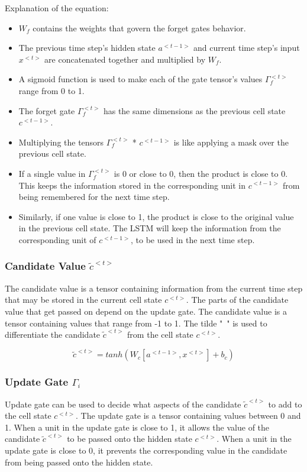 Explanation of the equation:
\begin{itemize}
    \item $W_f$ contains the weights that govern the forget gate\textquotesingle s behavior.
    \item The previous time step's hidden state $a^{<t - 1>}$  and current time step's input $x^{<t>}$ are concatenated together and multiplied by $W_f$.
    \item A sigmoid function is used to make each of the gate tensor's values $\Gamma _f ^ {<t>}$ range from 0 to 1.
    \item The forget gate $\Gamma _f ^ {<t>}$
          has the same dimensions as the previous cell state $c^{<t - 1>}$.
    \item Multiplying the tensors $\Gamma _f ^ {<t>}$ * $c^{<t - 1>}$
          is like applying a mask over the previous cell state.
    \item If a single value in $\Gamma _f ^ {<t>}$ is 0 or close to 0, then the product is close to 0. This keeps the information stored in the corresponding unit in $c^{<t - 1>}$ from being remembered for the next time step.
    \item Similarly, if one value is close to 1, the product is close to the original value in the previous cell state. The LSTM will keep the information from the corresponding unit of $c^{<t - 1>}$, to be used in the next time step.
\end{itemize}

\subsubsection{Candidate Value $\tilde{c}^{<t>}$}
The candidate value is a tensor containing information from the current time step that may be stored in the current cell state $c^{<t>}$. The parts of the candidate value that get passed on depend on the update gate.
The candidate value is a tensor containing values that range from -1 to 1.
The tilde "~" is used to differentiate the candidate $\tilde{c}^{<t>}$ from the cell state $c^{<t>}$.

\begin{equation}
    \tilde{c}^{<t>} = tanh(W_c[a^{<t - 1>}, x^{<t>}] + b_c)
\end{equation}

\subsubsection{Update Gate $\Gamma _i$}
Update gate can be used to decide what aspects of the candidate $\tilde{c}^{<t>}$ to add to the cell state $c^{<t>}$. The update gate is a tensor containing values between 0 and 1. When a unit in the update gate is close to 1, it allows the value of the candidate $\tilde{c}^{<t>}$ to be passed onto the hidden state $c^{<t>}$. When a unit in the update gate is close to 0, it prevents the corresponding value in the candidate from being passed onto the hidden state.

